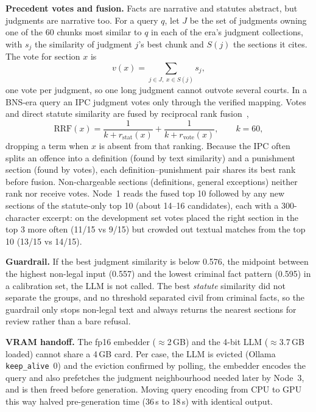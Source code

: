 \documentclass[conference]{IEEEtran}
\begin{document}
\textbf{Precedent votes and fusion.} Facts are narrative and statutes abstract, but judgments are narrative too. For a query $q$, let $J$ be the set of judgments owning one of the 60 chunks most similar to $q$ in each of the era's judgment collections, with $s_j$ the similarity of judgment $j$'s best chunk and $S(j)$ the sections it cites. The vote for section $x$ is
\begin{equation}
v(x) = \sum_{j \in J,\; x \in S(j)} s_j ,
\end{equation}
one vote per judgment, so one long judgment cannot outvote several courts. In a BNS-era query an IPC judgment votes only through the verified mapping. Votes and direct statute similarity are fused by reciprocal rank fusion~\cite{rrf},
\begin{equation}
\mathrm{RRF}(x) = \frac{1}{k + r_{\mathrm{stat}}(x)} + \frac{1}{k + r_{\mathrm{vote}}(x)}, \qquad k = 60,
\end{equation}
dropping a term when $x$ is absent from that ranking. Because the IPC often splits an offence into a definition (found by text similarity) and a punishment section (found by votes), each definition--punishment pair shares its best rank before fusion. Non-chargeable sections (definitions, general exceptions) neither rank nor receive votes. Node~1 reads the fused top 10 followed by any new sections of the statute-only top 10 (about 14--16 candidates), each with a 300-character excerpt: on the development set votes placed the right section in the top 3 more often (11/15 vs 9/15) but crowded out textual matches from the top 10 (13/15 vs 14/15).

\textbf{Guardrail.} If the best judgment similarity is below 0.576, the midpoint between the highest non-legal input (0.557) and the lowest criminal fact pattern (0.595) in a calibration set, the LLM is not called. The best \emph{statute} similarity did not separate the groups, and no threshold separated civil from criminal facts, so the guardrail only stops non-legal text and always returns the nearest sections for review rather than a bare refusal.

\textbf{VRAM handoff.} The fp16 embedder ($\approx$2\,GB) and the 4-bit LLM ($\approx$3.7\,GB loaded) cannot share a 4\,GB card. Per case, the LLM is evicted (Ollama \texttt{keep\_alive}~0) and the eviction confirmed by polling, the embedder encodes the query and also prefetches the judgment neighbourhood needed later by Node~3, and is then freed before generation. Moving query encoding from CPU to GPU this way halved pre-generation time (36\,s to 18\,s) with identical output.
\end{document}
